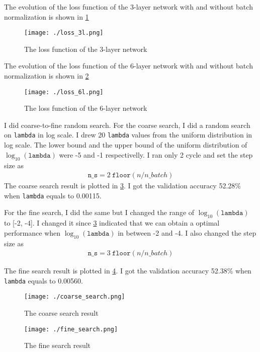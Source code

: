 \documentclass[12pt]{article}
\newenvironment{question}[2][Question]{\begin{trivlist}
\kern10pt
\item[\hskip \labelsep {\bfseries #1}\hskip \labelsep {\bfseries #2.}]}{\end{trivlist}}
\begin{document}
\begin{question}{ii}
    The evolution of the loss function of the 3-layer network with and without
    batch normalization is shown in \cref{plt:loss_3l}
    \begin{figure}[h]
        \centering
        \texttt{[image: ./loss\_3l.png]}
        \caption{The loss function of the 3-layer network}
        \label{plt:loss_3l}
    \end{figure}
\end{question}

\begin{question}{iii}
    The evolution of the loss function of the 6-layer network with and without
    batch normalization is shown in \cref{plt:loss_6l}
    \begin{figure}[h]
        \centering
        \texttt{[image: ./loss\_6l.png]}
        \caption{The loss function of the 6-layer network}
        \label{plt:loss_6l}
    \end{figure}
\end{question}
\begin{question}{iv}
    I did coarse-to-fine random search.
    For the coarse search, I did a random search on \texttt{lambda} in log scale.
    I drew 20 \texttt{lambda} values from the uniform distribution in log scale.
    The lower bound and the upper bound of the uniform distribution of $\log_{10}(\texttt{lambda})$
    were -5 and -1 respectivelly. I ran only 2 cycle and set the step size as
    \begin{align*}
        \texttt{n\_s} = 2 ~ \texttt{floor}(n / n\_batch)
    \end{align*}
    The coarse search result is plotted in \cref{plt:coarse_search}.
    I got the validation accuracy 52.28\% when \texttt{lambda} equals to 0.00115.

    For the fine search, I did the same but I changed the range of
    $\log_{10}(\texttt{lambda})$ to [-2, -4]. I changed it since
    \cref{plt:coarse_search} indicated that we can obtain a optimal performance
    when $\log_{10}(\texttt{lambda})$ in between -2 and -4.
    I also changed the step size as
    \begin{align*}
        \texttt{n\_s} = 3 ~ \texttt{floor}(n / n\_batch)
    \end{align*}

    The fine search result is plotted in \cref{plt:fine_search}.
    I got the validation accuracy 52.38\% when \texttt{lambda} equals to 0.00560.


    \begin{figure}[h]
        \centering
        \texttt{[image: ./coarse\_search.png]}
        \caption{The coarse search result}
        \label{plt:coarse_search}
    \end{figure}

    \begin{figure}[h]
        \centering
        \texttt{[image: ./fine\_search.png]}
        \caption{The fine search result}
        \label{plt:fine_search}
    \end{figure}
\end{question}
\end{document}
